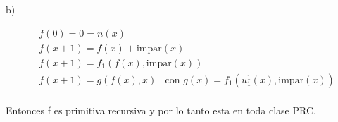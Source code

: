 \documentclass{report}
\begin{document}
\sol b)
\begin{myproof}
	$$\begin{aligned}
	&f(0)=0=n(x) \\
	&f(x+1)=f(x)+\text{impar}(x) \\
	&f(x+1)=f_{1}(f(x),\text{impar}(x)) \\
	&f(x+1)=g(f(x),x) \ \ \ \ \text{con } g(x)=f_{1}(u_{1}^{1}(x),\text{impar}(x))
	\end{aligned}$$\\Entonces f es primitiva recursiva y por lo tanto esta en toda clase PRC.
\end{myproof}
\end{document}
